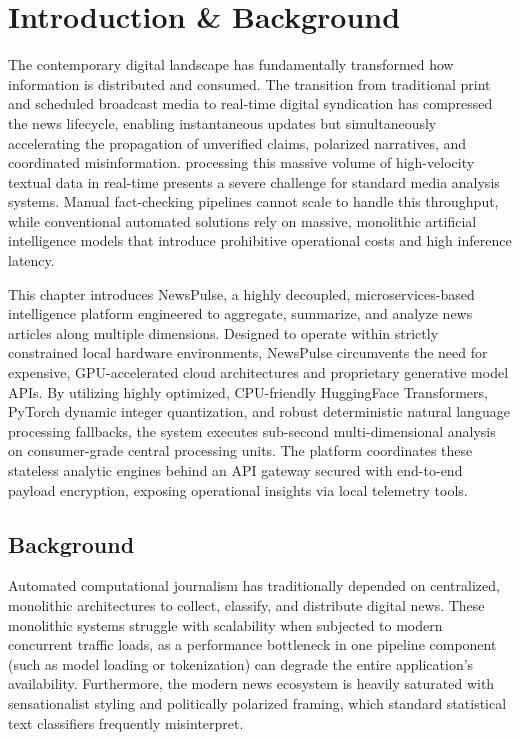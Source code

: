 \chapter{Introduction \& Background}
\label{sec:introduction-background}
\newpage

The contemporary digital landscape has fundamentally transformed how information is distributed and consumed. The transition from traditional print and scheduled broadcast media to real-time digital syndication has compressed the news lifecycle, enabling instantaneous updates but simultaneously accelerating the propagation of unverified claims, polarized narratives, and coordinated misinformation. processing this massive volume of high-velocity textual data in real-time presents a severe challenge for standard media analysis systems. Manual fact-checking pipelines cannot scale to handle this throughput, while conventional automated solutions rely on massive, monolithic artificial intelligence models that introduce prohibitive operational costs and high inference latency.

This chapter introduces NewsPulse, a highly decoupled, microservices-based intelligence platform engineered to aggregate, summarize, and analyze news articles along multiple dimensions. Designed to operate within strictly constrained local hardware environments, NewsPulse circumvents the need for expensive, GPU-accelerated cloud architectures and proprietary generative model APIs. By utilizing highly optimized, CPU-friendly HuggingFace Transformers, PyTorch dynamic integer quantization, and robust deterministic natural language processing fallbacks, the system executes sub-second multi-dimensional analysis on consumer-grade central processing units. The platform coordinates these stateless analytic engines behind an API gateway secured with end-to-end payload encryption, exposing operational insights via local telemetry tools.

\section{Background}
Automated computational journalism has traditionally depended on centralized, monolithic architectures to collect, classify, and distribute digital news. These monolithic systems struggle with scalability when subjected to modern concurrent traffic loads, as a performance bottleneck in one pipeline component (such as model loading or tokenization) can degrade the entire application's availability. Furthermore, the modern news ecosystem is heavily saturated with sensationalist styling and politically polarized framing, which standard statistical text classifiers frequently misinterpret.


